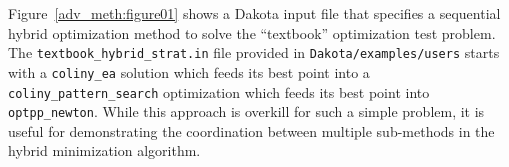 
Figure~\ref{adv_meth:figure01} shows a Dakota input file that specifies
a sequential hybrid optimization method to solve the
``textbook'' optimization test problem.
The \texttt{textbook\_hybrid\_strat.in} file
provided in {\tt Dakota/examples/users} starts with a
\texttt{coliny\_ea} solution which feeds its best point into a
\texttt{coliny\_pattern\_search} optimization which feeds its best
point into \texttt{optpp\_newton}. While this approach is overkill for
such a simple problem, it is useful for demonstrating the coordination
between multiple sub-methods in the hybrid minimization algorithm.


